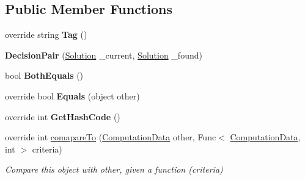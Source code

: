 \subsection*{Public Member Functions}
\begin{DoxyCompactItemize}
\item 
\mbox{\label{classPOSL_1_1Data_1_1DecisionPair_a4f788fe41311016d6dddf877d9d6242a}} 
override string {\bfseries Tag} ()
\item 
\mbox{\label{classPOSL_1_1Data_1_1DecisionPair_ae46b40ebacd27dabc909d32c7bd607e0}} 
{\bfseries Decision\+Pair} (\hyperlink{classPOSL_1_1Data_1_1Solution}{Solution} \+\_\+current, \hyperlink{classPOSL_1_1Data_1_1Solution}{Solution} \+\_\+found)
\item 
\mbox{\label{classPOSL_1_1Data_1_1DecisionPair_a60666eb915fc24969228af5603eb0447}} 
bool {\bfseries Both\+Equals} ()
\item 
\mbox{\label{classPOSL_1_1Data_1_1DecisionPair_a28598b5e6693c16d43417d445a3ba47b}} 
override bool {\bfseries Equals} (object other)
\item 
\mbox{\label{classPOSL_1_1Data_1_1DecisionPair_adb91932988131b145473d3d3391c4a59}} 
override int {\bfseries Get\+Hash\+Code} ()
\item 
override int \hyperlink{classPOSL_1_1Data_1_1DecisionPair_a86eb9f86339a60733443d1fd1332913d}{comapare\+To} (\hyperlink{classPOSL_1_1Data_1_1ComputationData}{Computation\+Data} other, Func$<$ \hyperlink{classPOSL_1_1Data_1_1ComputationData}{Computation\+Data}, int $>$ criteria)
\begin{DoxyCompactList}\small\item\em Compare this object with other, given a function (criteria) \end{DoxyCompactList}\end{DoxyCompactItemize}
